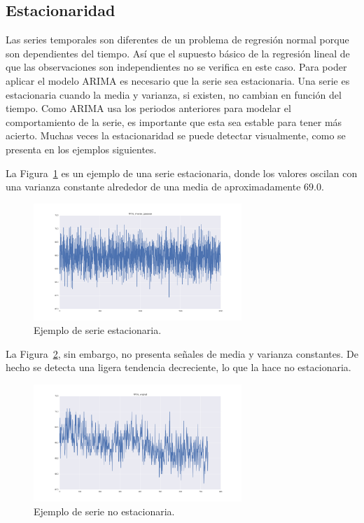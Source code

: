 \documentclass[11pt,spanish,listoffigures,listoftables]{tfgetsinf}
\begin{document}
    \subsection{Estacionaridad}
    Las series temporales son diferentes de un problema de regresión normal porque son dependientes del tiempo. Así que el supuesto básico de la regresión lineal de que las observaciones son independientes no se verifica en este caso. Para poder aplicar el modelo ARIMA es necesario que la serie sea estacionaria. Una serie es estacionaria cuando la media y varianza, si existen, no cambian en función del tiempo. Como ARIMA usa los periodos anteriores para modelar el comportamiento de la serie, es importante que esta sea estable para tener más acierto. Muchas veces la estacionaridad se puede detectar visualmente, como se presenta en los ejemplos siguientes.
    
    La Figura~\ref{fig:stationary} es un ejemplo de una serie estacionaria, donde los valores oscilan con una varianza constante alrededor de una media de aproximadamente \(69.0\). 
    
    \begin{figure}[h]
        \centering
        \includegraphics[width=0.7\textwidth]{APVs_inverse_gaussian.png}
        \caption{Ejemplo de serie estacionaria.}
        \label{fig:stationary}
    \end{figure}

    La Figura~\ref{fig:non_stationary}, sin embargo, no presenta señales de media y varianza constantes. De hecho se detecta una ligera tendencia decreciente, lo que la hace no estacionaria. 
    
    \begin{figure}[h]
        \centering
        \includegraphics[width=0.7\textwidth]{APVs_original.png}
        \caption{Ejemplo de serie no estacionaria.}
        \label{fig:non_stationary}
    \end{figure}
    
\end{document}
